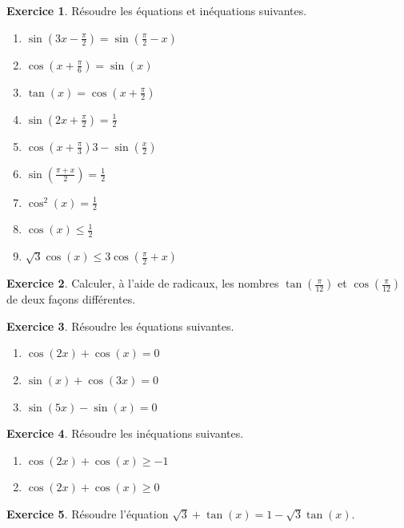 \documentclass[french]{book}
\theoremstyle{definition}
\newtheorem{ex}{Exercice}[chapter]
\theoremstyle{theorem}
\theoremstyle{remark}
\begin{document}
\begin{ex}
	Résoudre les équations et inéquations suivantes.
	\begin{enumerate}
		\item $\displaystyle\sin\left(3x-\frac{\pi}{2}\right)=\sin\left(\frac{\pi}{2}-x\right)$
		\item $\displaystyle\cos\left(x+\frac{\pi}{6}\right)=\sin(x)$
		\item $\displaystyle\tan(x)=\cos\left(x+\frac{\pi}{2}\right)$
		\item $\displaystyle\sin\left(2x+\frac{\pi}{2}\right)=\frac{1}{2}$
		\item $\displaystyle\cos\left(x+\frac{\pi}{3}\right)3-\sin\left(\frac{x}{2}\right)$
		\item $\displaystyle\sin\left(\frac{\pi+x}{2}\right)=\frac{1}{2}$
		\item $\displaystyle\cos^2(x)=\frac{1}{2}$
		\item $\displaystyle\cos(x)\leqslant\frac{1}{2}$
		\item $\displaystyle\sqrt{3}\cos(x)\leqslant 3\cos\left(\frac{\pi}{2}+x\right)$
	\end{enumerate}
\end{ex}

\begin{ex}
	Calculer, à l'aide de radicaux, les nombres $\displaystyle\tan\left(\frac{\pi}{12}\right)$ et $\displaystyle\cos\left(\frac{\pi}{12}\right)$ de deux façons différentes.
\end{ex}

\begin{ex}
	Résoudre les équations suivantes.
	\begin{enumerate}
		\item $\cos(2x)+\cos(x)=0$
		\item $\sin(x)+\cos(3x)=0$
		\item $\sin(5x)-\sin(x)=0$
	\end{enumerate}
\end{ex}

\begin{ex}
	Résoudre les inéquations suivantes.
	\begin{enumerate}
		\item $\cos(2x)+\cos(x)\geqslant-1$
		\item $\cos(2x)+\cos(x)\geqslant0$
	\end{enumerate}
\end{ex}

\begin{ex}
	Résoudre l'équation $\sqrt{3}+\tan(x)=1-\sqrt{3}\tan(x)$.
\end{ex}
\end{document}

